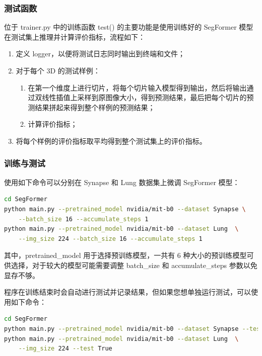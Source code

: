 \documentclass[hyperref,a4paper,UTF8]{ctexart}
\begin{document}
\subsubsection{测试函数}

位于 trainer.py 中的训练函数 test() 的主要功能是使用训练好的 SegFormer 模型在测试集上推理并计算评价指标，流程如下：

\begin{enumerate}[itemsep=2pt,topsep=0pt,parsep=0pt]
    \item 定义 logger，以便将测试日志同时输出到终端和文件；
    \item 对于每个 3D 的测试样例：
    \begin{enumerate}[itemsep=2pt,topsep=0pt,parsep=0pt]
        \item 在第一个维度上进行切片，将每个切片输入模型得到输出，然后将输出通过双线性插值上采样到原图像大小，得到预测结果，最后把每个切片的预测结果拼起来得到整个样例的预测结果；
        \item 计算评价指标；
    \end{enumerate}
    \item 将每个样例的评价指标取平均得到整个测试集上的评价指标。
\end{enumerate}

\subsubsection{训练与测试}

使用如下命令可以分别在 Synapse 和 Lung 数据集上微调 SegFormer 模型：

\begin{lstlisting}[language=bash]
cd SegFormer
python main.py --pretrained_model nvidia/mit-b0 --dataset Synapse \
    --batch_size 16 --accumulate_steps 1
python main.py --pretrained_model nvidia/mit-b0 --dataset Lung  \
    --img_size 224 --batch_size 16 --accumulate_steps 1
\end{lstlisting}

其中，pretrained\_model 用于选择预训练模型，一共有 6 种大小的预训练模型可供选择，对于较大的模型可能需要调整 batch\_size 和 accumulate\_steps 参数以免显存不够。

程序在训练结束时会自动进行测试并记录结果，但如果您想单独运行测试，可以使用如下命令：

\begin{lstlisting}[language=bash]
cd SegFormer
python main.py --pretrained_model nvidia/mit-b0 --dataset Synapse --test True
python main.py --pretrained_model nvidia/mit-b0 --dataset Lung  \
    --img_size 224 --test True
\end{lstlisting}
\end{document}
